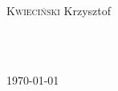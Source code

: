 \begin{titlepage}
\begin{minipage}{0.4\textwidth}
\begin{flushleft} \large
\textsc{Kwieciński} Krzysztof \\
\end{flushleft}
\end{minipage}
~
\begin{minipage}{0.4\textwidth}
\begin{flushright} \large
\end{flushright}
\end{minipage}\\[4cm]




{\large \today}\\[3cm] %


 

\vfill %

\end{titlepage}